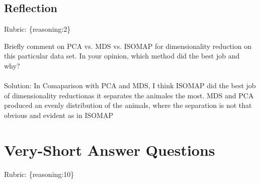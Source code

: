 \documentclass{article}
\def\rubric#1{\gre{Rubric: \{#1\}}}{}
\def\blu#1{{\color{blu}#1}}
\def\gre#1{{\color{gre}#1}}
\begin{document}
\subsection{Reflection}
\rubric{reasoning:2}

\blu{Briefly comment on PCA vs. MDS vs. ISOMAP for dimensionality reduction on this particular data set. In your opinion, which method did the best job and why?} \\ \\
\gre{Solution: In Comaparison with PCA and MDS, I think ISOMAP did the best job of dimensionality reductionas  it separates the animales the most. MDS and PCA produced an evenly distribution of the animals, where the separation is not that obvious and evident as in ISOMAP }

\section{Very-Short Answer Questions}
\rubric{reasoning:10}
\end{document}
